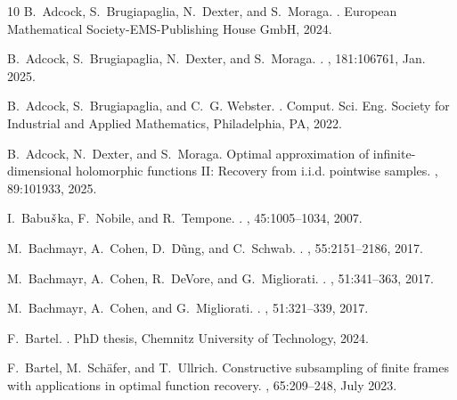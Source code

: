 \documentclass[11pt]{article}
\numberwithin{equation}{section}
\theoremstyle{definition}
\theoremstyle{remark}
\begin{document}
{\begin{thebibliography}{10}
B.~Adcock, S.~Brugiapaglia, N.~Dexter, and S.~Moraga.
.
\newblock European Mathematical Society-EMS-Publishing House GmbH, 2024.

B.~Adcock, S.~Brugiapaglia, N.~Dexter, and S.~Moraga.
.
, 181:106761, Jan. 2025.

B.~Adcock, S.~Brugiapaglia, and C.~G. Webster.
.
\newblock Comput. Sci. Eng. Society for Industrial and Applied Mathematics,
  Philadelphia, PA, 2022.

B.~Adcock, N.~Dexter, and S.~Moraga.
\newblock Optimal approximation of infinite-dimensional holomorphic functions
  {II}: Recovery from i.i.d. pointwise samples.
, 89:101933, 2025.

I.~Babu{$\check{{\rm s}}$}ka, F.~Nobile, and R.~Tempone.
.
, 45:1005--1034, 2007.

M.~Bachmayr, A.~Cohen, D.~{D\~ ung}, and C.~Schwab.
.
, 55:2151--2186, 2017.

M.~Bachmayr, A.~Cohen, R.~DeVore, and G.~Migliorati.
.
, 51:341--363, 2017.

M.~Bachmayr, A.~Cohen, and G.~Migliorati.
.
, 51:321--339, 2017.

F.~Bartel.
.
\newblock PhD thesis, Chemnitz University of Technology, 2024.

F.~Bartel, M.~Sch\"{a}fer, and T.~Ullrich.
\newblock Constructive subsampling of finite frames with applications in
  optimal function recovery.
, 65:209–248, July 2023.


\end{thebibliography}}
\end{document}
